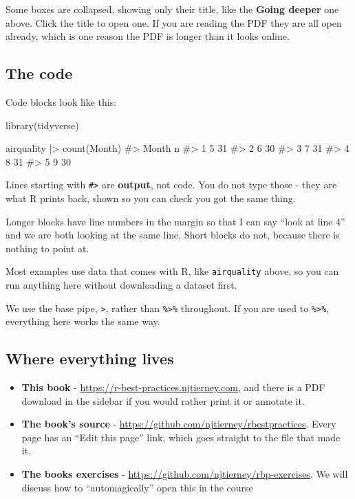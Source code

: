 \documentclass[
  letterpaper,
  justified,
  a4paper]{tufte-book}
\makeatletter
\newenvironment{Shaded}{\begin{snugshade}}{\end{snugshade}}
\newcommand{\CommentTok}[1]{\textcolor[rgb]{0.37,0.37,0.37}{#1}}
\newcommand{\FunctionTok}[1]{\textcolor[rgb]{0.28,0.35,0.67}{#1}}
\newcommand{\NormalTok}[1]{\textcolor[rgb]{0.00,0.23,0.31}{#1}}
\newcommand{\SpecialCharTok}[1]{\textcolor[rgb]{0.37,0.37,0.37}{#1}}
\providecommand{\tightlist}{%
  \setlength{\itemsep}{0pt}\setlength{\parskip}{0pt}}
\providecommand{\tightlist}{%
  \setlength{\itemsep}{0pt}\setlength{\parskip}{0pt}}
\let\rbporigShaded\Shaded
\let\rbporigendShaded\endShaded
\renewenvironment{Shaded}{%
  \begingroup
  \ifdim\linewidth=\rbpbodywidth
    \advance\linewidth by \@tufte@overhang
    \advance\hsize by \@tufte@overhang
    \advance\columnwidth by \@tufte@overhang
  \fi
  \rbporigShaded
}{%
  \rbporigendShaded
  \endgroup
}
\makeatother
\begin{document}
Some boxes are collapsed, showing only their title, like the
\textbf{Going deeper} one above. Click the title to open one. If you are
reading the PDF they are all open already, which is one reason the PDF
is longer than it looks online.

\subsection*{The code}\label{the-code}

Code blocks look like this:

\begin{Shaded}
\begin{Highlighting}[]
\FunctionTok{library}\NormalTok{(tidyverse)}

\NormalTok{airquality }\SpecialCharTok{|\textgreater{}}
  \FunctionTok{count}\NormalTok{(Month)}
\CommentTok{\#\textgreater{}   Month  n}
\CommentTok{\#\textgreater{} 1     5 31}
\CommentTok{\#\textgreater{} 2     6 30}
\CommentTok{\#\textgreater{} 3     7 31}
\CommentTok{\#\textgreater{} 4     8 31}
\CommentTok{\#\textgreater{} 5     9 30}
\end{Highlighting}
\end{Shaded}

Lines starting with \texttt{\#\textgreater{}} are \textbf{output}, not
code. You do not type those - they are what R prints back, shown so you
can check you got the same thing.

Longer blocks have line numbers in the margin so that I can say ``look
at line 4'' and we are both looking at the same line. Short blocks do
not, because there is nothing to point at.

Most examples use data that comes with R, like \texttt{airquality}
above, so you can run anything here without downloading a dataset first.

We use the base pipe, \texttt{\textbar{}\textgreater{}}, rather than
\texttt{\%\textgreater{}\%} throughout. If you are used to
\texttt{\%\textgreater{}\%}, everything here works the same way.

\subsection*{Where everything lives}\label{where-everything-lives}

\begin{itemize}
\tightlist
\item
  \textbf{This book} - \url{https://r-best-practices.njtierney.com}, and
  there is a PDF download in the sidebar if you would rather print it or
  annotate it.
\item
  \textbf{The book's source} -
  \url{https://github.com/njtierney/rbestpractices}. Every page has an
  ``Edit this page'' link, which goes straight to the file that made it.
\item
  \textbf{The books exercises} -
  \url{https://github.com/njtierney/rbp-exercises}. We will discuss how
  to ``automagically'' open this in the course
\end{itemize}
\end{document}
